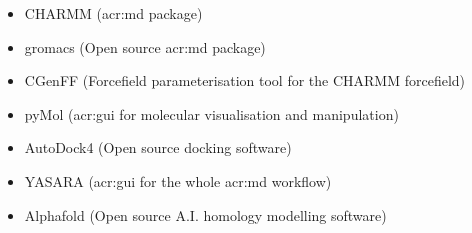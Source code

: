 \begin{itemize}
    \item CHARMM\cite{Brooks1983CHARMM:Calculations} (\gls{acr:md} package)
    \item gromacs\cite{Berendsen1995GROMACS:Implementation} (Open source \gls{acr:md} package)
    \item CGenFF\cite{Vanommeslaeghe2012AutomationTyping} (Forcefield parameterisation tool for the CHARMM forcefield)
    \item pyMol (\gls{acr:gui} for molecular visualisation and manipulation)
    \item AutoDock4\cite{Morris2009AutoDock4Flexibility} (Open source docking software)
    \item YASARA\cite{Krieger2014YASARAWorkstations} (\gls{acr:gui} for the whole \gls{acr:md} workflow)
    \item Alphafold\cite{Jumper2021HighlyAlphaFold, Varadi2022AlphaFoldModels} (Open source A.I. homology modelling software) 
\end{itemize}


